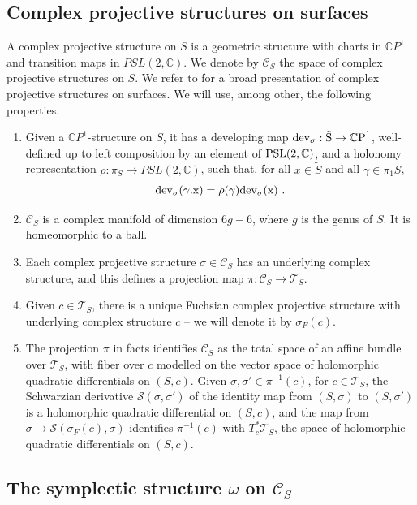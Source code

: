 \documentclass[notitlepage,twoside,a4paper]{amsart}
\theoremstyle{named}
\newcommand{\C}{{\mathbb C}}
\newcommand{\CP}{{\mathbb CP}}
\newcommand{\cC}{{\mathcal C}}
\newcommand{\cS}{{\mathcal S}}
\newcommand{\cT}{{\mathcal T}}
\newcommand{\PSL}{\rm{PSL}}
\begin{document}
\subsection{Complex projective structures on surfaces}
\label{ssc:cp1}

A complex projective structure on $S$ is a geometric structure with charts in $\CP^1$ and transition maps in $PSL(2,\C)$. We denote by $\cC_S$ the space of complex projective structures on $S$. We refer to \cite{dumas-survey} for a broad presentation of complex projective structures on surfaces. We will use, among other, the following properties.
\begin{enumerate}
\item Given a $\CP^1$-structure on $S$, it has a developing map $\rm{dev}_\sigma:\tilde S\to \CP^1$, well-defined up to left composition by an element of $\PSL(2, \C)$, and a holonomy representation $\rho:\pi_S\to PSL(2,\C)$, such that, for all $x\in \tilde S$ and all $\gamma\in \pi_1S$,
  $$ \rm{dev}_\sigma(\gamma.x)=\rho(\gamma)\rm{dev}_\sigma(x)~. $$
\item $\cC_S$ is a complex manifold of dimension $6g-6$, where $g$ is the genus of $S$. It is homeomorphic to a ball.
\item Each complex projective structure $\sigma \in \cC_S$ has an underlying complex structure, and this defines a projection map $\pi:\cC_S\to \cT_S$.
\item Given $c\in \cT_S$, there is a unique Fuchsian complex projective structure with underlying complex structure $c$ -- we will denote it by $\sigma_F(c)$.  
\item The projection $\pi$ in facts identifies $\cC_S$ as the total space of an affine bundle over $\cT_S$, with fiber over $c$ modelled on the vector space of holomorphic quadratic differentials on $(S,c)$. Given $\sigma, \sigma'\in \pi^{-1}(c)$, for $c\in \cT_S$, the Schwarzian derivative $\cS(\sigma, \sigma')$ of the identity map from $(S,\sigma)$ to $(S,\sigma')$ is a holomorphic quadratic differential on $(S,c)$, and the map from $\sigma\to \cS(\sigma_F(c),\sigma)$ identifies $\pi^{-1}(c)$ with $T^*_c\cT_S$, the space of holomorphic quadratic differentials on $(S,c)$. 
\end{enumerate}

\subsection{The symplectic structure $\omega$ on $\cC_S$}
\label{ssc:symplectic}
\end{document}
